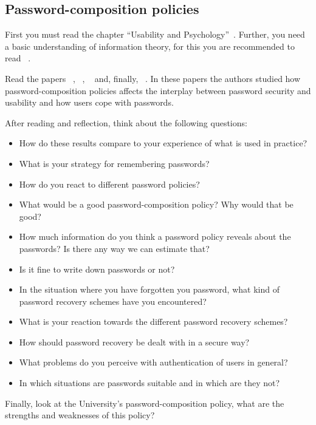 \subsection{Password-composition policies}

First you must read the chapter \enquote{Usability and 
  Psychology}~\cite[Ch.~2]{Anderson2008sea}.
Further, you need a basic understanding of information theory, for this you are 
recommended to read ~\cite{Ueltschi2013se}.

Read the papers
~\cite{OfPasswordsAndPeople}, 
~\cite{GuessAgainAndAgain},
~\cite{CanLongPasswordsBeSecureAndUsable} 
and, finally,
~\cite{PasswordLifeCycle}.
In these papers the authors studied how password-composition policies affects 
the interplay between password security and usability and how users cope with 
passwords.

After reading and reflection, think about the following questions:
\begin{itemize}
  \item How do these results compare to your experience of what is used in 
    practice?
  \item What is your strategy for remembering passwords?
  \item How do you react to different password policies?
  \item What would be a good password-composition policy?
    Why would that be good?
  \item How much information do you think a password policy reveals about the 
    passwords?
    Is there any way we can estimate that?
  \item Is it fine to write down passwords or not?
  \item In the situation where you have forgotten you password,
  	what kind of password recovery schemes have you encountered?
  \item What is your reaction towards the different password recovery schemes?  
  \item How should password recovery be dealt with in a secure way?
  \item What problems do you perceive with authentication of users in general?
  \item In which situations are passwords suitable and in which are they not?
\end{itemize}
Finally, look at the University's password-composition policy, what are the 
strengths and weaknesses of this policy?

